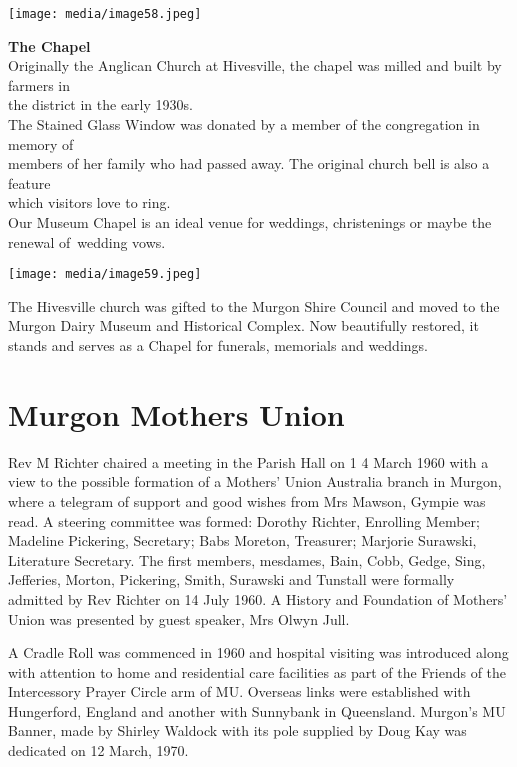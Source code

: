\texttt{[image: media/image58.jpeg]}

\textbf{The Chapel}\\
Originally the Anglican Church at Hivesville, the chapel was milled and built by farmers in\\
the district in the early 1930s.\\
The Stained Glass Window was donated by a member of the congregation in memory of\\
members of her family who had passed away. The original church bell is also a feature\\
which visitors love to ring.\\
Our Museum Chapel is an ideal venue for weddings, christenings or maybe the renewal of~wedding vows.

\texttt{[image: media/image59.jpeg]}

The Hivesville church was gifted to the Murgon Shire Council and moved to the Murgon Dairy Museum and Historical Complex. Now beautifully restored, it stands and serves as a Chapel for funerals, memorials and weddings.

\hypertarget{murgon-mothers-union}{%
\section{Murgon Mothers Union}\label{murgon-mothers-union}}

Rev M Richter chaired a meeting in the Parish Hall on 1 4 March 1960 with a view to the possible formation of a Mothers' Union Australia branch in Murgon, where a telegram of support and good wishes from Mrs Mawson, Gympie was read. A steering committee was formed: Dorothy Richter, Enrolling Member; Madeline Pickering, Secretary; Babs Moreton, Treasurer; Marjorie Surawski, Literature Secretary. The first members, mesdames, Bain, Cobb, Gedge, Sing, Jefferies, Morton, Pickering, Smith, Surawski and Tunstall were formally admitted by Rev Richter on 14 July 1960. A History and Foundation of Mothers' Union was presented by guest speaker, Mrs Olwyn Jull.

A Cradle Roll was commenced in 1960 and hospital visiting was introduced along with attention to home and residential care facilities as part of the Friends of the Intercessory Prayer Circle arm of MU. Overseas links were established with Hungerford, England and another with Sunnybank in Queensland. Murgon's MU Banner, made by Shirley Waldock with its pole supplied by Doug Kay was dedicated on 12 March, 1970.

